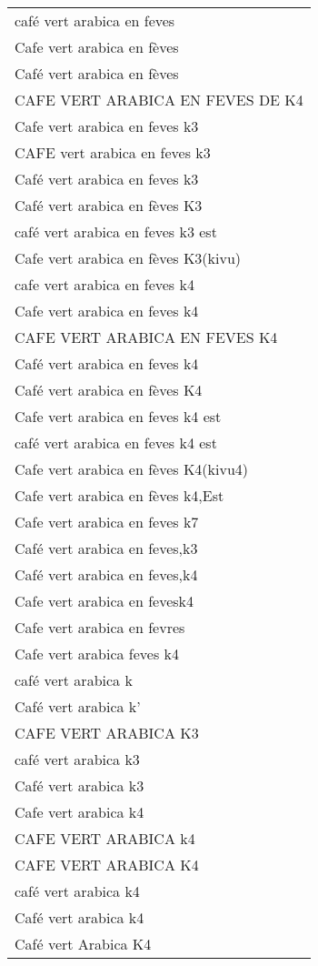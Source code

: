 \documentclass[
]{book}
\begin{document}
\begin{longtable}[t]{l}
café vert arabica en feves\\
\addlinespace
Cafe vert arabica en fèves\\
Café vert arabica en fèves\\
CAFE VERT ARABICA EN FEVES DE K4\\
Cafe vert arabica en feves k3\\
CAFE vert arabica en feves k3\\
\addlinespace
Café vert arabica en feves k3\\
Café vert arabica en fèves K3\\
café vert arabica en feves k3 est\\
Cafe vert arabica en fèves K3(kivu)\\
cafe vert arabica en feves k4\\
\addlinespace
Cafe vert arabica en feves k4\\
CAFE VERT ARABICA EN FEVES K4\\
Café vert arabica en feves k4\\
Café vert arabica en fèves K4\\
Cafe vert arabica en feves k4 est\\
\addlinespace
café vert arabica en feves k4 est\\
Cafe vert arabica en fèves K4(kivu4)\\
Cafe vert arabica en fèves k4,Est\\
Cafe vert arabica en feves k7\\
Café vert arabica en feves,k3\\
\addlinespace
Café vert arabica en feves,k4\\
Cafe vert arabica en fevesk4\\
Cafe vert arabica en fevres\\
Cafe vert arabica feves k4\\
café vert arabica k\\
\addlinespace
Café vert arabica k'\\
CAFE VERT ARABICA K3\\
café vert arabica k3\\
Café vert arabica k3\\
Cafe vert arabica k4\\
\addlinespace
CAFE VERT ARABICA k4\\
CAFE VERT ARABICA K4\\
café vert arabica k4\\
Café vert arabica k4\\
Café vert Arabica K4\\

\end{longtable}
\end{document}
